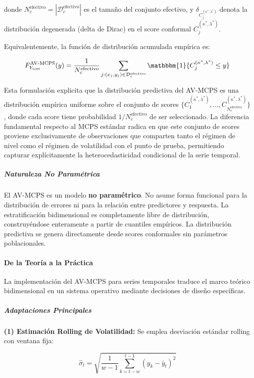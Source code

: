 donde $N_c^{\text{efectivo}} = |\mathcal{D}_c^{\text{efectivo}}|$ es el tamaño del conjunto efectivo, y $\delta_{C_j^{(\kappa^*,\lambda^*)}}$ denota la distribución degenerada (delta de Dirac) en el score conformal $C_j^{(\kappa^*,\lambda^*)}$.

Equivalentemente, la función de distribución acumulada empírica es:

\begin{equation}
F_{Y_{\text{test}}}^{\text{AV-MCPS}}(y) = \frac{1}{N_c^{\text{efectivo}}} \sum_{j: (x_j, y_j) \in \mathcal{D}_c^{\text{efectivo}}} \mathbbm{1}\{C_j^{(\kappa^*,\lambda^*)} \leq y\}
\label{eq:avmcps_cdf}
\end{equation}

Esta formulación explicita que la distribución predictiva del AV-MCPS es una distribución empírica uniforme sobre el conjunto de scores $\{C_1^{(\kappa^*,\lambda^*)}, \ldots, C_{N_c^{\text{efectivo}}}^{(\kappa^*,\lambda^*)}\}$, donde cada score tiene probabilidad $1/N_c^{\text{efectivo}}$ de ser seleccionado. La diferencia fundamental respecto al MCPS estándar radica en que este conjunto de scores proviene exclusivamente de observaciones que comparten tanto el régimen de nivel como el régimen de volatilidad con el punto de prueba, permitiendo capturar explícitamente la heterocedasticidad condicional de la serie temporal.
\subparagraph{Naturaleza No Paramétrica}

El AV-MCPS es un modelo \textbf{no paramétrico}. No asume forma funcional para la distribución de errores ni para la relación entre predictores y respuesta. La estratificación bidimensional es completamente libre de distribución, construyéndose enteramente a partir de cuantiles empíricos. La distribución predictiva se genera directamente desde scores conformales sin parámetros poblacionales.

\paragraph{De la Teoría a la Práctica}

La implementación del AV-MCPS para series temporales traduce el marco teórico bidimensional en un sistema operativo mediante decisiones de diseño específicas.

\subparagraph{Adaptaciones Principales}

\textbf{(1) Estimación Rolling de Volatilidad:} Se emplea desviación estándar rolling con ventana fija:

\begin{equation}
\hat{\sigma}_t = \sqrt{\frac{1}{w-1} \sum_{k=t-w}^{t-1} (y_k - \bar{y}_t)^2}
\end{equation}


